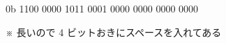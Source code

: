 \correct
\begin{center}
0b 1100 0000 1011 0001 0000 0000 0000 0000

\noindent ※ 長いので 4 ビットおきにスペースを入れてある
\end{center}
